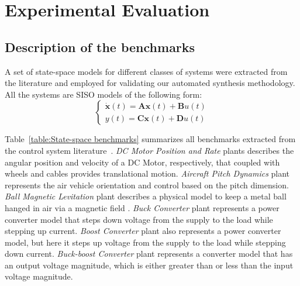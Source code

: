 \documentclass[runningheads,a4paper]{llncs}
\begin{document}
\section{Experimental Evaluation}


\subsection{Description of the benchmarks}

A set of state-space models for different classes of 
systems were extracted from the literature and employed 
for validating our automated synthesis methodology. 
All the systems are SISO models of the following form:
%
\begin{equation}
\left\lbrace\begin{array}{c}
\dot{\textbf{x}}(t)=\textbf{A}\textbf{x}(t)+\textbf{B}u(t)\\
y(t)=\textbf{C}\textbf{x}(t)+\textbf{D}u(t)
\end{array}\right.
\end{equation}

Table~\ref{table:State-space benchmarks} summarizes all benchmarks extracted 
from the control system literature~\cite{Franklin15,maglev,converters,CTMS}. 
\textit{DC Motor Position and Rate} plants describes the angular position and 
velocity of a DC Motor, respectively, that coupled with wheels and cables provides 
translational motion. 
\textit{Aircraft Pitch Dynamics} plant represents the air vehicle orientation and 
control based on the pitch dimension. 
\textit{Ball Magnetic Levitation} plant describes a physical model to keep a 
metal ball hanged in air via a magnetic field . 
\textit{Buck Converter} plant represents a power converter model that steps down 
voltage from the supply to the load while stepping up current. 
\textit{Boost Converter} plant also represents a power converter model, but here 
it steps up voltage from the supply to the load while stepping down current. 
\textit{Buck-boost Converter} plant represents a converter model that has an output 
voltage magnitude, which is either greater than or less than the input voltage magnitude. 
\end{document}
